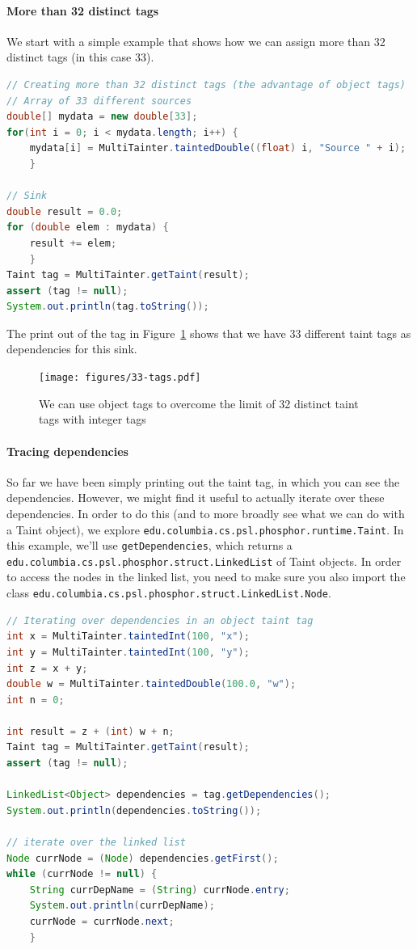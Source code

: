 \documentclass[a4paper]{article}
\begin{document}
\paragraph{More than 32 distinct tags}
We start with a simple example that shows how we can assign more than 32 distinct tags (in this case 33).

\begin{lstlisting}[language=java]
// Creating more than 32 distinct tags (the advantage of object tags)
// Array of 33 different sources
double[] mydata = new double[33];
for(int i = 0; i < mydata.length; i++) {
    mydata[i] = MultiTainter.taintedDouble((float) i, "Source " + i);
    }
    
// Sink
double result = 0.0;
for (double elem : mydata) {
    result += elem;
    }
Taint tag = MultiTainter.getTaint(result);
assert (tag != null);
System.out.println(tag.toString());
\end{lstlisting}

The print out of the tag in Figure~\ref{fig:33-tags} shows that we have 33 different taint tags as dependencies for this sink.


\begin{figure}
\texttt{[image: figures/33-tags.pdf]}
\caption{We can use object tags to overcome the limit of 32 distinct taint tags with integer tags}
\label{fig:33-tags}
\end{figure}

\paragraph{Tracing dependencies}
So far we have been simply printing out the taint tag, in which you can see the dependencies.
However, we might find it useful to actually iterate over these dependencies.
In order to do this (and to more broadly see what we can do with a Taint object),
we explore \verb|edu.columbia.cs.psl.phosphor.runtime.Taint|.
In this example, we'll use \verb|getDependencies|,
which returns a
\\
\verb|edu.columbia.cs.psl.phosphor.struct.LinkedList|
of Taint objects.
In order to access the nodes in the linked list, you need to make sure you also import
the class \verb|edu.columbia.cs.psl.phosphor.struct.LinkedList.Node|.

\begin{lstlisting}[language=java]
// Iterating over dependencies in an object taint tag
int x = MultiTainter.taintedInt(100, "x");
int y = MultiTainter.taintedInt(100, "y");
int z = x + y;
double w = MultiTainter.taintedDouble(100.0, "w");
int n = 0;

int result = z + (int) w + n;
Taint tag = MultiTainter.getTaint(result);
assert (tag != null);

LinkedList<Object> dependencies = tag.getDependencies();
System.out.println(dependencies.toString());

// iterate over the linked list
Node currNode = (Node) dependencies.getFirst();
while (currNode != null) {
    String currDepName = (String) currNode.entry;
    System.out.println(currDepName);
    currNode = currNode.next;
    }
\end{lstlisting}
\end{document}
